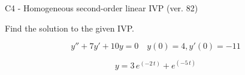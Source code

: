 \begin{exercise}
  \begin{exerciseTitle}C4 - Homogeneous second-order linear IVP (ver. 82)\end{exerciseTitle}
  \begin{exerciseStatement}
    
Find the solution to the given IVP.

    
\[y''+7y'+10y = 0 \hspace{1em} y(0) = 4 , y'(0) = -11\]

  \end{exerciseStatement}
  \begin{exerciseAnswer}
    
\[y= 3 \, e^{\left(-2 \, t\right)} + e^{\left(-5 \, t\right)}\]

  \end{exerciseAnswer}
\end{exercise}